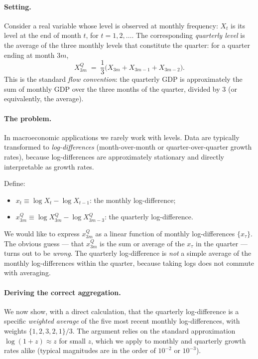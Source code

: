 \documentclass[11pt, a4paper, oneside]{article}
\begin{document}
\paragraph{Setting.}
Consider a real variable whose level is observed at monthly frequency:
$X_t$ is its level at the end of month $t$, for $t = 1, 2, \ldots$.
The corresponding \emph{quarterly level} is the average of the three
monthly levels that constitute the quarter: for a quarter ending at
month $3m$,
\[
X^Q_{3m} \;=\; \frac{1}{3}\big(X_{3m} + X_{3m-1} + X_{3m-2}\big).
\]
This is the standard \emph{flow convention}: the quarterly GDP is
approximately the sum of monthly GDP over the three months of the
quarter, divided by $3$ (or equivalently, the average).

\paragraph{The problem.}
In macroeconomic applications we rarely work with levels. Data are
typically transformed to \emph{log-differences}
(month-over-month or quarter-over-quarter growth rates), because
log-differences are approximately stationary and directly interpretable
as growth rates.

Define:
\begin{itemize}[leftmargin=1.5em, itemsep=2pt]
    \item $x_t \equiv \log X_t - \log X_{t-1}$: the monthly log-difference;
    \item $x^Q_{3m} \equiv \log X^Q_{3m} - \log X^Q_{3m-3}$: the quarterly log-difference.
\end{itemize}
We would like to express $x^Q_{3m}$ as a linear function of monthly
log-differences $\{x_\tau\}$. The obvious guess — that $x^Q_{3m}$
is the sum or average of the $x_\tau$ in the quarter — turns out to
be \emph{wrong}. The quarterly log-difference is \emph{not} a simple
average of the monthly log-differences within the quarter, because
taking logs does not commute with averaging.

\paragraph{Deriving the correct aggregation.}
We now show, with a direct calculation, that the quarterly
log-difference is a specific \emph{weighted average} of the five most
recent monthly log-differences, with weights $\{1, 2, 3, 2, 1\}/3$.
The argument relies on the standard approximation
$\log(1 + z) \approx z$ for small $z$, which we apply to monthly and
quarterly growth rates alike (typical magnitudes are in the order of
$10^{-2}$ or $10^{-3}$).
\end{document}
